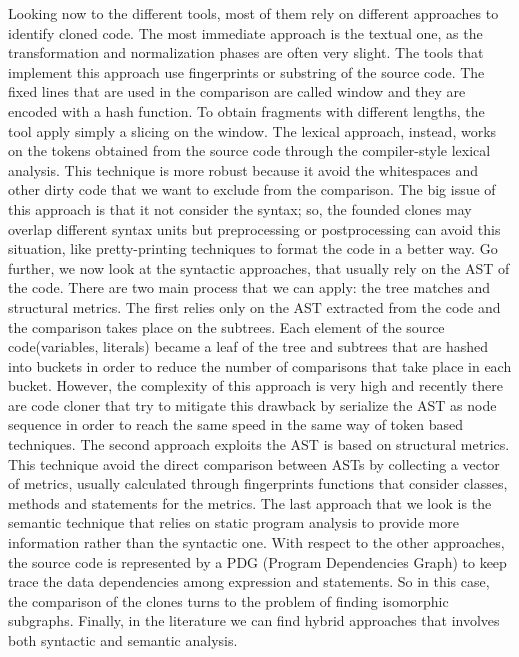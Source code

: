Looking now to the different tools, most of them rely on different approaches to identify cloned code. The most immediate approach is the textual one, as the transformation and normalization phases are often very slight. The tools that implement this approach use fingerprints or substring of the source code. The fixed lines that are used in the comparison are called window and they are encoded with a hash function. To obtain fragments with different lengths, the tool apply simply a slicing on the window. The lexical approach, instead, works on the tokens obtained from the source code through the compiler-style lexical analysis. This technique is more robust because it avoid the whitespaces and other dirty code that we want to exclude from the comparison. The big issue of this approach is that it not consider the syntax; so, the founded clones may overlap different syntax units but preprocessing or postprocessing can avoid this situation, like pretty-printing techniques to format the code in a better way. Go further, we now look at the syntactic approaches, that usually rely on the AST of the code. There are two main process  that we can apply: the tree matches and structural metrics. The first relies only on the AST extracted from the code and the comparison takes place on the subtrees. Each element of the source code(variables, literals) became a leaf of the tree and subtrees that are hashed into buckets in order to reduce the number of comparisons that take place in each bucket. However, the complexity of this approach is very high and recently there are code cloner that try to mitigate this drawback by serialize the AST as node sequence in order to reach the same speed in the same way of  token based techniques. The second approach  exploits the AST is based on structural metrics. This technique avoid the direct comparison between ASTs by collecting a vector of metrics, usually calculated through fingerprints functions that consider classes, methods and statements for the metrics. The last approach that we look is the semantic technique that relies on static program analysis to provide more information rather than the syntactic one. With respect to the other approaches, the source code is represented by a PDG (Program Dependencies Graph) to keep trace the data dependencies among expression and statements. So in this case, the comparison of the clones turns to the problem of finding isomorphic subgraphs. Finally, in the literature we can find hybrid approaches that involves both syntactic and semantic analysis. \\
